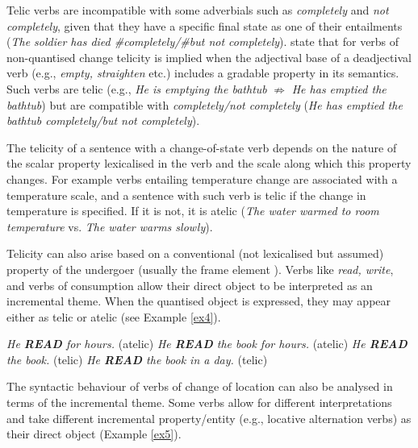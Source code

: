 \documentclass[output=paper,colorlinks,citecolor=brown]{langscibook}
\begin{document}
Telic verbs are incompatible with some adverbials such as \textit{completely} and \textit{not completely}, given that they have a specific final state as one of their entailments (\textit{The soldier has died \#completely\slash \#but not completely}). \citet[129]{Hay1999} state that for verbs of non-quantised change telicity is implied when the adjectival base of a deadjectival verb (e.g., \textit{empty, straighten} etc.) includes a gradable property in its semantics. Such verbs are telic (e.g., \textit{He is emptying the bathtub} $\nRightarrow$ \textit{He has emptied the bathtub}) but are compatible with \textit{completely\slash not completely} (\textit{He has emptied the bathtub completely\slash but not completely}).

The telicity of a sentence with a change-of-state verb depends on the nature of the scalar property lexicalised in the verb and the scale along which this property changes. For example verbs entailing temperature change are associated with a temperature scale, and a sentence with such verb is telic if the change in temperature is specified. If it is not, it is atelic (\textit{The water warmed to room temperature} vs. \textit{The water warms slowly}).


Telicity can also arise based on a conventional (not lexicalised but assumed) property of the undergoer (usually the frame element ). Verbs like \textit{read, write}, and verbs of consumption allow their direct object to be interpreted as an incremental theme. When the quantised object is expressed, they may appear either as telic or atelic (see Example \ref{ex4}). 

 \begin{exe}
 \ex \label{ex4}
     \begin{xlist}
         \ex\label{ex4a} \textit{He \textbf{READ} for hours.} (atelic)
         \ex\label{ex4b} \textit{He \textbf{READ} the book for hours.} (atelic)
         \ex\label{ex4c} \textit{He \textbf{READ} the book.} (telic)
	   \ex \label{ex4d}\textit{He \textbf{READ} the book in a day.} (telic)
     \end{xlist}
\end{exe}

The syntactic behaviour of verbs of change of location can also be analysed in terms of the incremental theme. Some verbs allow for different interpretations and take different incremental property\slash entity (e.g., locative alternation verbs) as their direct object (Example \ref{ex5}).
\end{document}
